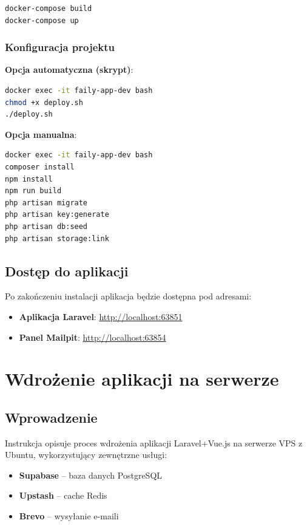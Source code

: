 \documentclass[12pt,a4paper]{article}
\begin{document}
\begin{lstlisting}[language=bash, caption=Uruchomienie kontenerów]
docker-compose build
docker-compose up
\end{lstlisting}

\subsubsection{Konfiguracja projektu}

\textbf{Opcja automatyczna (skrypt)}:
\begin{lstlisting}[language=bash, caption=Użycie skryptu konfiguracyjnego]
docker exec -it faily-app-dev bash
chmod +x deploy.sh
./deploy.sh
\end{lstlisting}

\textbf{Opcja manualna}:
\begin{lstlisting}[language=bash, caption=Konfiguracja manualna]
docker exec -it faily-app-dev bash
composer install
npm install
npm run build
php artisan migrate
php artisan key:generate
php artisan db:seed
php artisan storage:link
\end{lstlisting}

\subsection{Dostęp do aplikacji}

Po zakończeniu instalacji aplikacja będzie dostępna pod adresami:
\begin{itemize}[itemsep=1pt]
    \item \textbf{Aplikacja Laravel}: \url{http://localhost:63851}
    \item \textbf{Panel Mailpit}: \url{http://localhost:63854}
\end{itemize}

\newpage

\section{Wdrożenie aplikacji na serwerze}

\subsection{Wprowadzenie}

Instrukcja opisuje proces wdrożenia aplikacji Laravel+Vue.js na serwerze VPS z Ubuntu, wykorzystujący zewnętrzne usługi:
\begin{itemize}[itemsep=1pt]
    \item \textbf{Supabase} -- baza danych PostgreSQL
    \item \textbf{Upstash} -- cache Redis
    \item \textbf{Brevo} -- wysyłanie e-maili
\end{itemize}
\end{document}
